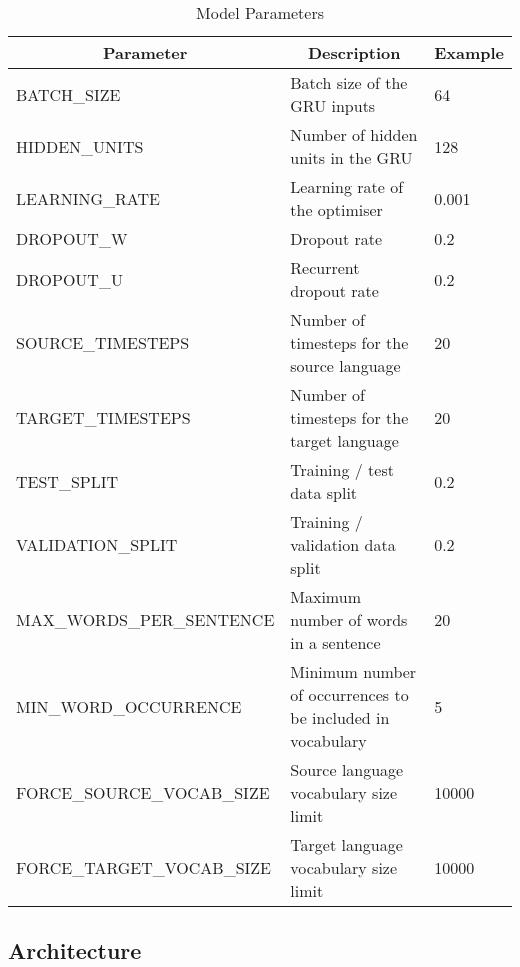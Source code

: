 \begin{table}[!ht]
\centering
\small
\begin{tabular}{|l|p{6.6cm}|l|}
\hline
\multicolumn{1}{|c|}{\textbf{Parameter}} & \multicolumn{1}{c|}{\textbf{Description}}                                       & \textbf{Example} \\ \hline
BATCH\_SIZE                & Batch size of the \acrshort{GRU} inputs            & 64    \\ \hline
HIDDEN\_UNITS              & Number of hidden units in the \acrshort{GRU}       & 128   \\ \hline
LEARNING\_RATE             & Learning rate of the optimiser                     & 0.001 \\ \hline
DROPOUT\_W                 & Dropout rate                                       & 0.2   \\ \hline
DROPOUT\_U                 & Recurrent dropout rate                             & 0.2   \\ \hline
SOURCE\_TIMESTEPS          & Number of timesteps for the source language        & 20    \\ \hline
TARGET\_TIMESTEPS          & Number of timesteps for the target language        & 20    \\ \hline
TEST\_SPLIT                & Training / test data split                         & 0.2   \\ \hline
VALIDATION\_SPLIT          & Training / validation data split                   & 0.2   \\ \hline
MAX\_WORDS\_PER\_SENTENCE  & Maximum number of words in a sentence              & 20    \\ \hline
MIN\_WORD\_OCCURRENCE      & Minimum number of occurrences to be included in vocabulary & 5 \\ \hline
FORCE\_SOURCE\_VOCAB\_SIZE & Source language vocabulary size limit              & 10000 \\ \hline
FORCE\_TARGET\_VOCAB\_SIZE & Target language vocabulary size limit              & 10000 \\ \hline
\end{tabular}
\captionsetup{justification=centering,font=Large}
\caption{Model Parameters}
\label{tab:model-parameters}
\end{table}

\subsection{Architecture}

